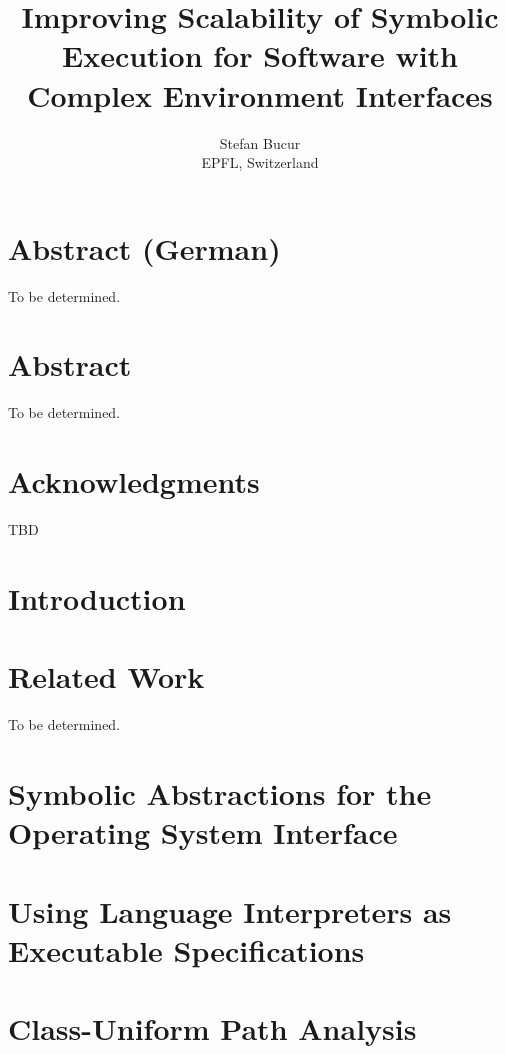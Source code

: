 \documentclass[letterpaper,10pt,oneside]{book}
\newcommand{\thesistitle}{Improving Scalability of Symbolic Execution for Software with Complex Environment Interfaces}
\begin{document}
\date{}
\title{\thesistitle}
\author{Stefan Bucur \\ EPFL, Switzerland}

\maketitle

\chapter*{Abstract (German)}

To be determined.

\chapter*{Abstract}

To be determined.

\chapter*{Acknowledgments}

TBD

\tableofcontents
\listoffigures
\listoftables

\chapter{Introduction}
\label{ch:introduction}



\chapter{Related Work}
\label{ch:relatedwork}

To be determined.


\chapter{Symbolic Abstractions for the Operating System Interface}
\label{ch:cloud9}


\chapter{Using Language Interpreters as Executable Specifications}
\label{ch:chef}


\chapter{Class-Uniform Path Analysis}
\label{ch:cupa}

\end{document}

